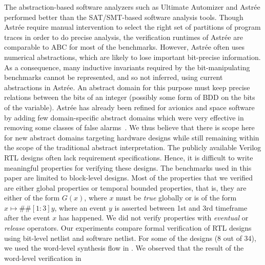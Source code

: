 %
The abstraction-based software analyzers such as Ultimate Automizer and Astr{\'e}e 
performed better than the SAT/SMT-based software analysis tools.  Though 
Astr{\'e}e require manual intervention to select the right set of partitions 
of program traces in order to do precise analysis, the verification runtimes 
of Astr{\'e}e are comparable to ABC for most of the benchmarks.  However, 
Astr{\'e}e often uses numerical abstractions, which are likely to lose 
important bit-precise information.  
%
As a consequence, many inductive invariants required by the bit-manipulating 
benchmarks cannot be represented, and so not inferred, using current abstractions 
in Astr{\'e}e.  An abstract domain for this purpose must keep 
precise relations between the bits of an integer (possibly some 
form of BDD on the bits of the variable).  Astr{\'e}e has already been 
refined for avionics and space software by adding few domain-specific 
abstract domains which were very effective in removing some classes of 
false alarms~\cite{DBLP:journals/ftpl/BertraneCCFMMR15}.  We thus believe 
that there is scope here for new abstract domains targeting hardware 
designs while still remaining within the scope of the traditional abstract 
interpretation. 
%
%
The publicly available Verilog RTL designs often lack requirement 
specifications.  Hence, it is difficult to write meaningful 
properties for verifying these designs.  The benchmarks used 
in this paper are limited to block-level designs. 
%
Most of the properties that we verified are either global properties 
or temporal bounded properties, that is, they are either of the form 
$G(x)$, where $x$ must be \emph{true} globally or is of the form 
$x \mapsto \#\#[1:3] y$, where an event $y$ is asserted between 1st and 
3rd timeframe after the event $x$ has happened.  We did not verify 
properties with \emph{eventual} or \emph{release} operators. 
%
Our experiments compare formal verification of RTL designs using 
bit-level netlist and software netlist.  
%
For some of the designs (8 out of 34), we used the word-level synthesis 
flow in \ebmc.  
We observed that the result of the word-level verification in \ebmc 
